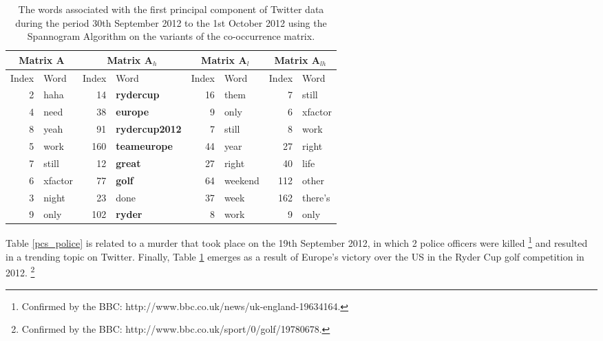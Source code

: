 \documentclass[graybox]{svmult}
\newcommand{\covmat}{\mathbf{A}}
\begin{document}
\begin{table}[H]
\center
\begin{tabular}{| r | l | r | l| r | l | r | l|}
\hline
\multicolumn{2}{|c|}{Matrix $\covmat$ }& \multicolumn{2}{|c|}{Matrix $\covmat_h$}& \multicolumn{2}{|c|}{Matrix $\covmat_l$} & \multicolumn{2}{|c|}{Matrix $\covmat_{lh}$} \\

\hline
Index & Word &Index & Word & Index & Word & Index & Word\\
\hline
2 & haha & 14 & \textbf{rydercup} & 16 & them& 7 & still\\
4 & need  & 38 & \textbf{europe} & 9 & only &  6 & xfactor\\
8 & yeah &91 & \textbf{rydercup2012}& 7 & still  & 8 & work \\

5 & work & 160 & \textbf{teameurope}&44 & year  & 27 & right \\

7 & still &  12 & \textbf{great}&27 & right   & 40 & life\\

6 & xfactor & 77 & \textbf{golf}  &64& weekend & 112 & other  \\ 

3 & night &23 & done & 37 & week & 162 & there's\\
 
9 & only & 102 & \textbf{ryder}  & 8 & work & 9 & only\\

\hline
\end{tabular}

\caption{The words associated with the first principal component of Twitter data during the period 30th September 2012 to the 1st October 2012 using the Spannogram Algorithm on the variants of the co-occurrence matrix.}
\label{pcs_ryder}
\end{table}
Table \ref{pcs_police} is related to a murder that took place on the 19th September 2012, in which 2 police officers were killed \footnote{Confirmed by the BBC: http://www.bbc.co.uk/news/uk-england-19634164.} and resulted in a trending topic on Twitter. Finally, Table \ref{pcs_ryder} emerges as a result of Europe's victory over the US in the Ryder Cup golf competition in 2012. \footnote{Confirmed by the BBC: http://www.bbc.co.uk/sport/0/golf/19780678.}
\end{document}
